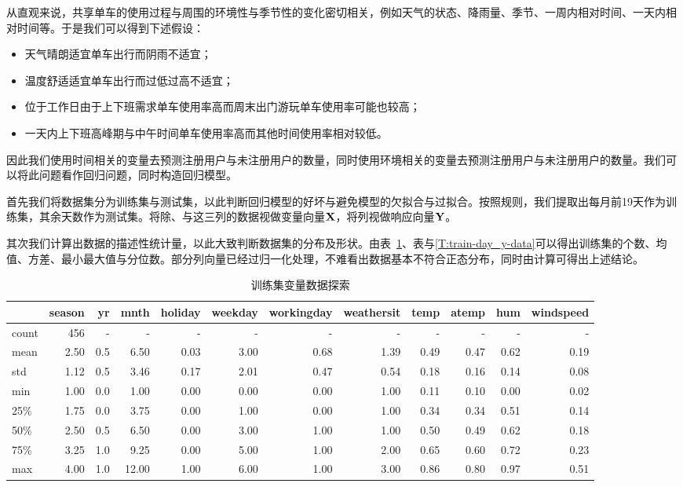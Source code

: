 从直观来说，共享单车的使用过程与周围的环境性与季节性的变化密切相关，例如天气的状态、降雨量、季节、一周内相对时间、一天内相对时间等。于是我们可以得到下述假设：
\begin{itemize}
    \item 天气晴朗适宜单车出行而阴雨不适宜；
    \item 温度舒适适宜单车出行而过低过高不适宜；
    \item 位于工作日由于上下班需求单车使用率高而周末出门游玩单车使用率可能也较高；
    \item 一天内上下班高峰期与中午时间单车使用率高而其他时间使用率相对较低。
\end{itemize}
因此我们使用时间相关的变量去预测注册用户与未注册用户的数量，同时使用环境相关的变量去预测注册用户与未注册用户的数量。我们可以将此问题看作回归问题，同时构造回归模型。

首先我们将数据集分为训练集与测试集，以此判断回归模型的好坏与避免模型的欠拟合与过拟合。按照规则，我们提取出每月前19天作为训练集，其余天数作为测试集。将除、与这三列的数据视做变量向量$\mathbf{X}$，将列视做响应向量$\mathbf{Y}$。

其次我们计算出数据的描述性统计量，以此大致判断数据集的分布及形状。由表~\ref{T:train-day_x-data}、表与\ref{T:train-day_y-data}可以得出训练集的个数、均值、方差、最小最大值与分位数。部分列向量已经过归一化处理，不难看出数据基本不符合正态分布，同时由计算可得出上述结论。

\begin{table}[htbp]
    \centering\tiny
    \begin{tabular}{lrrrrrrrrrrr}
    \toprule
    {} &  season &     yr &    mnth &  holiday &  weekday &  workingday &  weathersit &    temp &   atemp &     hum &  windspeed \\
    \midrule
    count &  456 &  -  &   -  &   -  &   -  &   -  &   -  &   -  &   -  &   -  &   -  \\
    mean  & 2.50 & 0.5 & 6.50 & 0.03 & 3.00 & 0.68 & 1.39 & 0.49 & 0.47 & 0.62 & 0.19 \\
    std   & 1.12 & 0.5 & 3.46 & 0.17 & 2.01 & 0.47 & 0.54 & 0.18 & 0.16 & 0.14 & 0.08 \\
    min   & 1.00 & 0.0 & 1.00 & 0.00 & 0.00 & 0.00 & 1.00 & 0.11 & 0.10 & 0.00 & 0.02 \\
    25\%  & 1.75 & 0.0 & 3.75 & 0.00 & 1.00 & 0.00 & 1.00 & 0.34 & 0.34 & 0.51 & 0.14 \\
    50\%  & 2.50 & 0.5 & 6.50 & 0.00 & 3.00 & 1.00 & 1.00 & 0.50 & 0.49 & 0.62 & 0.18 \\
    75\%  & 3.25 & 1.0 & 9.25 & 0.00 & 5.00 & 1.00 & 2.00 & 0.65 & 0.60 & 0.72 & 0.23 \\
    max   & 4.00 & 1.0 &12.00 & 1.00 & 6.00 & 1.00 & 3.00 & 0.86 & 0.80 & 0.97 & 0.51 \\
    \bottomrule
    \end{tabular}
    \cprotect\caption{训练集变量数据探索}\label{T:train-day_x-data}
\end{table}

